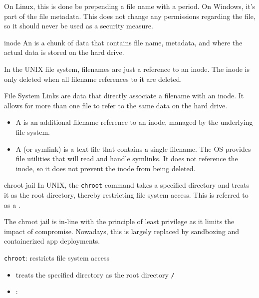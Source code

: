 On Linux, this is done be prepending a file name with a period. On Windows, it's part of the file metadata. This does not change any permissions regarding the file, so it should never be used as a security measure.

\begin{dfnbox}{inode}{}
    An  is a chunk of data that contains file name, metadata, and where the actual data is stored on the hard drive.
\end{dfnbox}

In the UNIX file system, filenames are just a reference to an inode. The inode is only deleted when all filename references to it are deleted.

\begin{dfnbox}{File System Links}{}
     are data that directly associate a filename with an inode. It allows for more than one file to refer to the same data on the hard drive.
    \begin{itemize}[noitemsep]
        \item A  is an additional filename reference to an inode, managed by the underlying file system.
        \item A  (or symlink) is a text file that contains a single filename. The OS provides file utilities that will read and handle symlinks. It does not reference the inode, so it does not prevent the inode from being deleted.
    \end{itemize}
\end{dfnbox}

\begin{dfnbox}{chroot jail}{}
    In UNIX, the \texttt{chroot} command takes a specified directory and treats it as the root directory, thereby restricting file system access. This is referred to as a .
\end{dfnbox}

The chroot jail is in-line with the principle of least privilege as it limits the impact of compromise. Nowadays, this is largely replaced by sandboxing and containerized app deployments.


\texttt{chroot}: restricts file system access
\begin{itemize}
    \item  treats the specified directory as the root directory \texttt{/}
    \item {}: 
\end{itemize}


